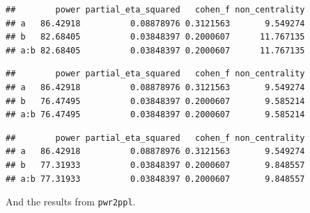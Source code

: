 \documentclass[
]{book}
\newenvironment{Shaded}{\begin{snugshade}}{\end{snugshade}}
\newcommand{\DataTypeTok}[1]{\textcolor[rgb]{0.13,0.29,0.53}{#1}}
\newcommand{\KeywordTok}[1]{\textcolor[rgb]{0.13,0.29,0.53}{\textbf{#1}}}
\newcommand{\NormalTok}[1]{#1}
\newcommand{\OperatorTok}[1]{\textcolor[rgb]{0.81,0.36,0.00}{\textbf{#1}}}
\newcommand{\OtherTok}[1]{\textcolor[rgb]{0.56,0.35,0.01}{#1}}
\newcommand{\StringTok}[1]{\textcolor[rgb]{0.31,0.60,0.02}{#1}}
\begin{document}
\begin{verbatim}
##        power partial_eta_squared   cohen_f non_centrality
## a   86.42918          0.08878976 0.3121563       9.549274
## b   82.68405          0.03848397 0.2000607      11.767135
## a:b 82.68405          0.03848397 0.2000607      11.767135
\end{verbatim}

\begin{Shaded}
\end{Shaded}

\begin{verbatim}
##        power partial_eta_squared   cohen_f non_centrality
## a   86.42918          0.08878976 0.3121563       9.549274
## b   76.47495          0.03848397 0.2000607       9.585214
## a:b 76.47495          0.03848397 0.2000607       9.585214
\end{verbatim}

\begin{Shaded}
\end{Shaded}

\begin{verbatim}
##        power partial_eta_squared   cohen_f non_centrality
## a   86.42918          0.08878976 0.3121563       9.549274
## b   77.31933          0.03848397 0.2000607       9.848557
## a:b 77.31933          0.03848397 0.2000607       9.848557
\end{verbatim}

And the results from \texttt{pwr2ppl}.
\end{document}
